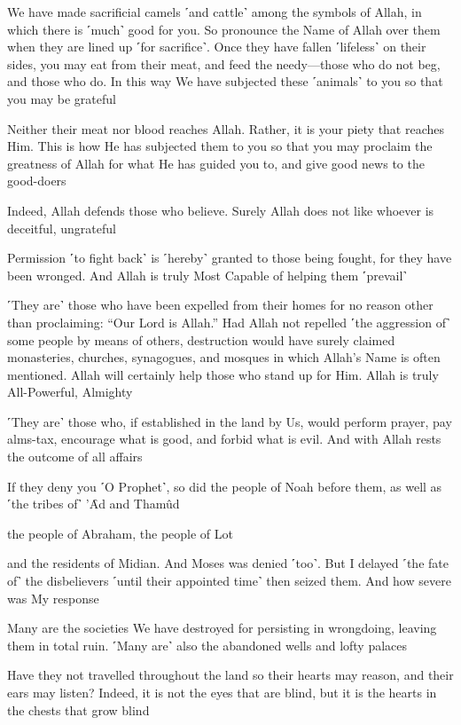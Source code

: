 We have made sacrificial camels ˹and cattle˺ among the symbols of Allah, in which there is ˹much˺ good for you. So pronounce the Name of Allah over them when they are lined up ˹for sacrifice˺. Once they have fallen ˹lifeless˺ on their sides, you may eat from their meat, and feed the needy—those who do not beg, and those who do. In this way We have subjected these ˹animals˺ to you so that you may be grateful

Neither their meat nor blood reaches Allah. Rather, it is your piety that reaches Him. This is how He has subjected them to you so that you may proclaim the greatness of Allah for what He has guided you to, and give good news to the good-doers

Indeed, Allah defends those who believe. Surely Allah does not like whoever is deceitful, ungrateful

Permission ˹to fight back˺ is ˹hereby˺ granted to those being fought, for they have been wronged. And Allah is truly Most Capable of helping them ˹prevail˺

˹They are˺ those who have been expelled from their homes for no reason other than proclaiming: “Our Lord is Allah.” Had Allah not repelled ˹the aggression of˺ some people by means of others, destruction would have surely claimed monasteries, churches, synagogues, and mosques in which Allah’s Name is often mentioned. Allah will certainly help those who stand up for Him. Allah is truly All-Powerful, Almighty

˹They are˺ those who, if established in the land by Us, would perform prayer, pay alms-tax, encourage what is good, and forbid what is evil. And with Allah rests the outcome of all affairs

If they deny you ˹O Prophet˺, so did the people of Noah before them, as well as ˹the tribes of˺ ’Ȃd and Thamûd

the people of Abraham, the people of Lot

and the residents of Midian. And Moses was denied ˹too˺. But I delayed ˹the fate of˺ the disbelievers ˹until their appointed time˺ then seized them. And how severe was My response

Many are the societies We have destroyed for persisting in wrongdoing, leaving them in total ruin. ˹Many are˺ also the abandoned wells and lofty palaces

Have they not travelled throughout the land so their hearts may reason, and their ears may listen? Indeed, it is not the eyes that are blind, but it is the hearts in the chests that grow blind

